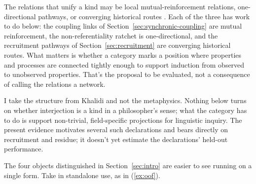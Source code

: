 \documentclass[12pt]{article}
\newcommand{\exmention}[1]{\mention{#1}}
\newcommand{\exfocus}[1]{\uline{#1}}
\begin{document}
The relations that unify a kind may be local mutual-reinforcement
relations, one-directional pathways, or converging historical routes
\citep{khalidi2013,khalidi2018nodes}. Each of
the three has work to do below: the coupling links of
Section~\ref{sec:synchronic-coupling} are mutual reinforcement, the
non-referentiality ratchet is one-directional, and the recruitment pathways of
Section~\ref{sec:recruitment} are converging historical routes. What matters is
whether a category marks a position where properties and processes are
connected tightly enough to support induction from observed to unobserved
properties. That's the proposal to be evaluated, not a consequence of calling
the relations a network.

I take the structure from Khalidi and not the metaphysics. Nothing below turns
on whether interjection is a kind in a philosopher's sense; what the category
has to do is support non-trivial, field-specific projections for linguistic
inquiry. The present evidence motivates several such declarations and bears
directly on recruitment and residue; it doesn't yet estimate the declarations'
held-out performance.

The four objects distinguished in Section~\ref{sec:intro} are easier to see
running on a single form. Take  in standalone use, as in
(\ref{ex:oof}).

\ea\label{ex:oof} \exmention{\exfocus{Oof}. That's going to hurt.}
\z
\end{document}
